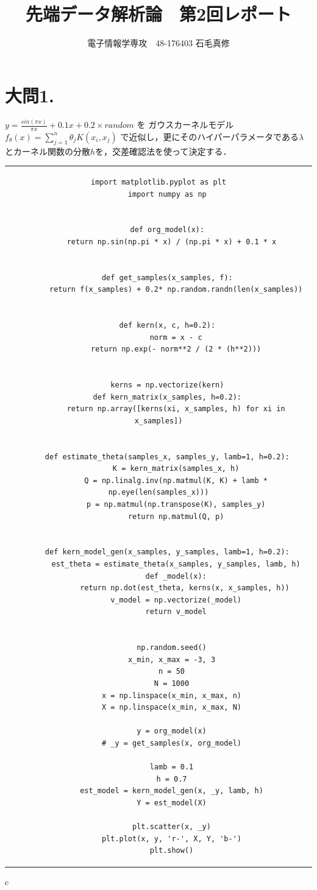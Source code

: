 \documentclass[fleqn]{jsarticle}
\begin{document}
\title{先端データ解析論　第2回レポート}
\author{電子情報学専攻　48-176403 石毛真修}
\maketitle


\section*{大問1.}
$y = \frac{sin(\pi x)}{\pi x} + 0.1x + 0.2 \times random$ を ガウスカーネルモデル $f_\theta(x) = \sum_{j=1}^n \theta_j K(x_i, x_j)$
で近似し，更にそのハイパーパラメータである$\lambda$とカーネル関数の分散$h$を，交差確認法を使って決定する．

\begin{center}
\begin{tabular}{c}
  \begin{lstlisting}[caption=Regression Part,label=src_regression]
    import matplotlib.pyplot as plt
    import numpy as np


    def org_model(x):
      return np.sin(np.pi * x) / (np.pi * x) + 0.1 * x


    def get_samples(x_samples, f):
        return f(x_samples) + 0.2* np.random.randn(len(x_samples))


    def kern(x, c, h=0.2):
        norm = x - c
        return np.exp(- norm**2 / (2 * (h**2)))


    kerns = np.vectorize(kern)
    def kern_matrix(x_samples, h=0.2):
        return np.array([kerns(xi, x_samples, h) for xi in x_samples])


    def estimate_theta(samples_x, samples_y, lamb=1, h=0.2):
        K = kern_matrix(samples_x, h)
        Q = np.linalg.inv(np.matmul(K, K) + lamb * np.eye(len(samples_x)))
        p = np.matmul(np.transpose(K), samples_y)
        return np.matmul(Q, p)


    def kern_model_gen(x_samples, y_samples, lamb=1, h=0.2):
        est_theta = estimate_theta(x_samples, y_samples, lamb, h)
        def _model(x):
            return np.dot(est_theta, kerns(x, x_samples, h))
        v_model = np.vectorize(_model)
        return v_model


      np.random.seed()
      x_min, x_max = -3, 3
      n = 50
      N = 1000
      x = np.linspace(x_min, x_max, n)
      X = np.linspace(x_min, x_max, N)

      y = org_model(x)
      # _y = get_samples(x, org_model)

      lamb = 0.1
      h = 0.7
      est_model = kern_model_gen(x, _y, lamb, h)
      Y = est_model(X)

      plt.scatter(x, _y)
      plt.plot(x, y, 'r-', X, Y, 'b-')
      plt.show()
  \end{lstlisting}
\end{tabular}{c}
\end{center}
\end{document}
